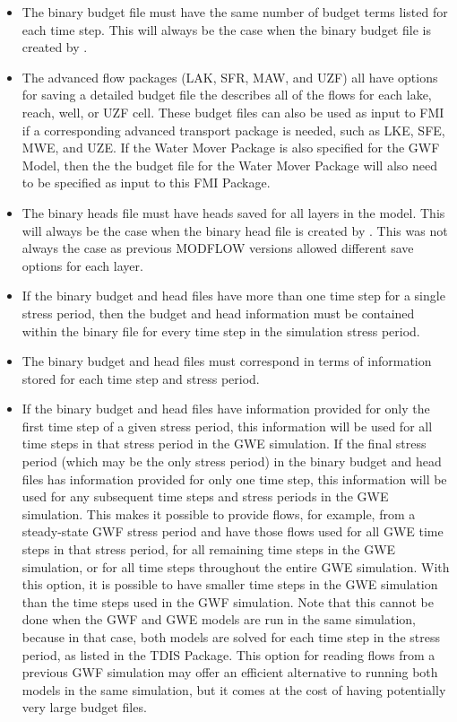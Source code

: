 \begin{itemize}
\begin{itemize}
\begin{verbatim}
BEGIN OPTIONS
  HEAD FILEOUT mymodel.hds
  BUDGET FILEOUT mymodel.bud
END OPTIONS

BEGIN PERIOD 1
  SAVE HEAD ALL
  SAVE BUDGET ALL
END PERIOD
\end{verbatim}

\item The binary budget file must have the same number of budget terms listed for each time step.  This will always be the case when the binary budget file is created by \mf.
\item The advanced flow packages (LAK, SFR, MAW, and UZF) all have options for saving a detailed budget file the describes all of the flows for each lake, reach, well, or UZF cell.  These budget files can also be used as input to FMI if a corresponding advanced transport package is needed, such as LKE, SFE, MWE, and UZE.  If the Water Mover Package is also specified for the GWF Model, then the the budget file for the Water Mover Package will also need to be specified as input to this FMI Package.
\item The binary heads file must have heads saved for all layers in the model.  This will always be the case when the binary head file is created by \mf.  This was not always the case as previous MODFLOW versions allowed different save options for each layer.
\item If the binary budget and head files have more than one time step for a single stress period, then the budget and head information must be contained within the binary file for every time step in the simulation stress period.
\item The binary budget and head files must correspond in terms of information stored for each time step and stress period.
\item If the binary budget and head files have information provided for only the first time step of a given stress period, this information will be used for all time steps in that stress period in the GWE simulation. If the final stress period (which may be the only stress period) in the binary budget and head files has information provided for only one time step, this information will be used for any subsequent time steps and stress periods in the GWE simulation. This makes it possible to provide flows, for example, from a steady-state GWF stress period and have those flows used for all GWE time steps in that stress period, for all remaining time steps in the GWE simulation, or for all time steps throughout the entire GWE simulation. With this option, it is possible to have smaller time steps in the GWE simulation than the time steps used in the GWF simulation. Note that this cannot be done when the GWF and GWE models are run in the same simulation, because in that case, both models are solved for each time step in the stress period, as listed in the TDIS Package. This option for reading flows from a previous GWF simulation may offer an efficient alternative to running both models in the same simulation, but it comes at the cost of having potentially very large budget files.

\end{itemize}
\end{itemize}
